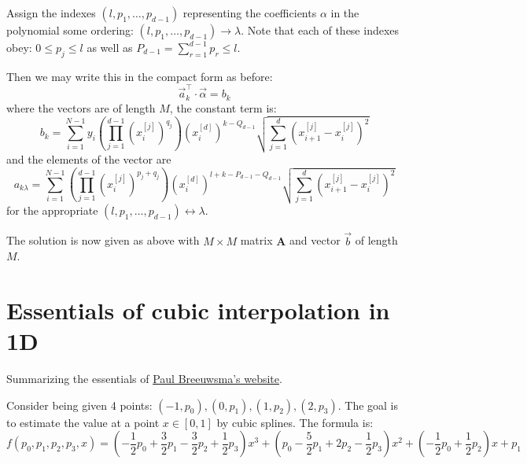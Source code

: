 \documentclass[11pt]{article}
\newcommand{\xdim}[1]{x^{[#1]}}
\begin{document}
Assign the indexes $(l,p_1,\dots,p_{d-1})$ representing the coefficients $\alpha$ in the polynomial some ordering: $(l,p_1,\dots,p_{d-1}) \rightarrow \lambda$. Note that each of these indexes obey: $0 \leq p_j \leq l$ as well as $P_{d-1} = \sum_{r=1}^{d-1} p_r \leq l$.

Then we may write this in the compact form as before:
\begin{equation}
\vec{a}_k^\intercal \cdot \vec{\alpha} = b_k
\end{equation}
where the vectors are of length $M$, the constant term is:
\begin{equation}
b_k = 
\sum_{i=1}^{N-1} 
y_i 
\left ( \prod_{j=1}^{d-1} (\xdim{j}_i)^{q_j} \right ) (\xdim{d}_i)^{k - Q_{d-1}} 
\sqrt{ \sum_{j=1}^d ( \xdim{j}_{i+1} - \xdim{j}_i )^2 }
\end{equation}
and the elements of the vector are
\begin{equation}
a_{k\lambda} = \sum_{i=1}^{N-1} 
\left ( \prod_{j=1}^{d-1} (\xdim{j}_i)^{p_j + q_j} \right ) 
(\xdim{d}_i)^{l + k - P_{d-1} - Q_{d-1}} 
\sqrt{ \sum_{j=1}^d ( \xdim{j}_{i+1} - \xdim{j}_i )^2 }
\end{equation}
for the appropriate $(l,p_1,\dots,p_{d-1}) \leftrightarrow \lambda$.

The solution is now given as above with $M \times M$ matrix $\boldsymbol{A}$ and vector $\vec{b}$ of length $M$.



\section{Essentials of cubic interpolation in 1D}


Summarizing the essentials of \href{https://www.paulinternet.nl/?page=bicubic}{Paul Breeuwsma's website}.

Consider being given 4 points: $(-1,p_0),(0,p_1),(1,p_2),(2,p_3)$. The goal is to estimate the value at a point $x \in [0,1]$ by cubic splines. The formula is:
\begin{equation}
f(p_0,p_1,p_2,p_3,x) = \left ( - \frac{1}{2} p_0 + \frac{3}{2} p_1 - \frac{3}{2} p_2 + \frac{1}{2} p_3 \right ) x^3 + \left ( p_0 - \frac{5}{2} p_1 + 2 p_2 - \frac{1}{2} p_3 \right ) x^2 + \left ( - \frac{1}{2} p_0 + \frac{1}{2} p_2 \right ) x + p_1
\end{equation}
\end{document}

